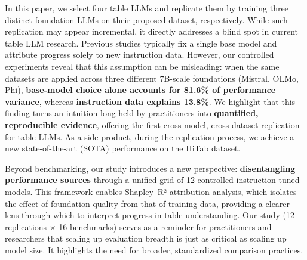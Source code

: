 \documentclass[11pt]{article}
\begin{document}
In this paper, we select four table LLMs and replicate them by training three distinct foundation LLMs on their proposed dataset, respectively.
While such replication may appear incremental, it directly addresses a blind spot in current table LLM research.
Previous studies \citep{zhang-etal-2024-tablellama, zhang2024tablellm, zha2023tablegpt} typically fix a single base model and attribute progress solely to new instruction data.
However, our controlled experiments reveal that this assumption can be misleading: when the same datasets are applied across three different 7B-scale foundations (Mistral, OLMo, Phi), {\bf base-model choice alone accounts for 81.6\% of performance variance}, whereas {\bf instruction data explains 13.8\%}.
We highlight that this finding turns an intuition long held by practitioners into {\bf quantified, reproducible evidence}, offering the first cross-model, cross-dataset replication for table LLMs.
As a side product, during the replication process, we achieve a new state-of-the-art (SOTA) performance on the HiTab dataset.

Beyond benchmarking, our study introduces a new perspective: {\bf disentangling performance sources} through a unified grid of 12 controlled instruction-tuned models.
This framework enables Shapley–R² attribution analysis, which isolates the effect of foundation quality from that of training data, providing a clearer lens through which to interpret progress in table understanding.
Our study (12 replications × 16 benchmarks) serves as a reminder for practitioners and researchers that scaling up evaluation breadth is just as critical as scaling up model size. 
It highlights the need for broader, standardized comparison practices.
\end{document}
